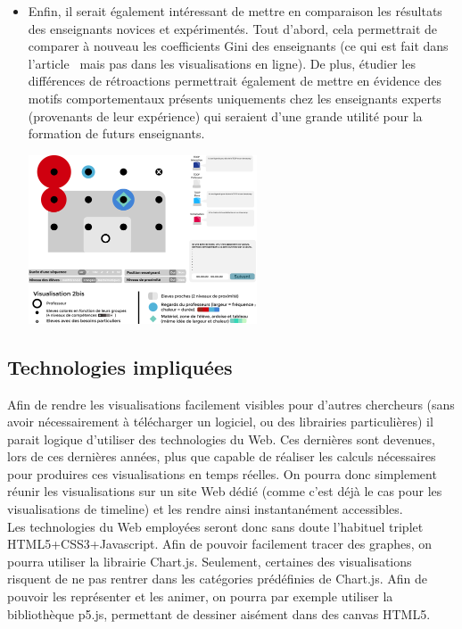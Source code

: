 \documentclass{article}
\begin{document}
\begin{itemize}
  \item Enfin, il serait également intéressant de mettre en comparaison les résultats des enseignants novices et expérimentés. Tout d'abord, cela permettrait de comparer à nouveau les coefficients Gini des enseignants (ce qui est fait dans l'article~\cite{SuperViseur} mais pas dans les visualisations en ligne). De plus, étudier les différences de rétroactions permettrait également de mettre en évidence des motifs comportementaux présents uniquements chez les enseignants experts (provenants de leur expérience) qui seraient d'une grande utilité pour la formation de futurs enseignants.
    \begin{center}
      \includegraphics[height=5cm]{visu_dessus.png}
    \end{center}
\end{itemize}

\subsection{Technologies impliquées}
Afin de rendre les visualisations facilement visibles pour d'autres chercheurs (sans avoir nécessairement à télécharger un logiciel, ou des librairies particulières) il parait logique d'utiliser des technologies du Web. Ces dernières sont devenues, lors de ces dernières années, plus que capable de réaliser les calculs nécessaires pour produires ces visualisations en temps réelles. On pourra donc simplement réunir les visualisations sur un site Web dédié (comme c'est déjà le cas pour les visualisations de timeline) et les rendre ainsi instantanément accessibles.\\
Les technologies du Web employées seront donc sans doute l'habituel triplet HTML5+CSS3+Javascript. Afin de pouvoir facilement tracer des graphes, on pourra utiliser la librairie Chart.js. Seulement, certaines des visualisations risquent de ne pas rentrer dans les catégories prédéfinies de Chart.js. Afin de pouvoir les représenter et les animer, on pourra par exemple utiliser la bibliothèque p5.js, permettant de dessiner aisément dans des canvas HTML5.\\

{}

\end{document}
